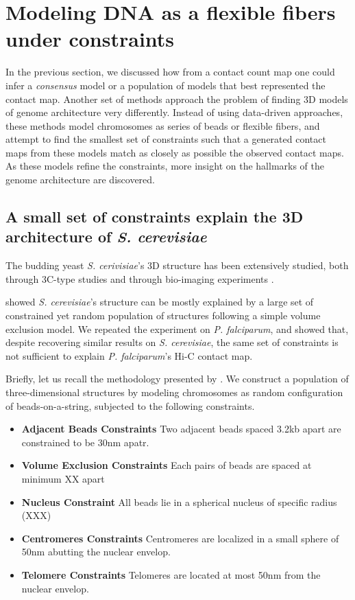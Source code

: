 \documentclass[letterpaper,12pt]{article}
\begin{document}
\section*{Modeling DNA as a flexible fibers under constraints}

In the previous section, we discussed how from a contact count map one could
infer a {\em consensus} model or a population of models that best represented
the contact map. Another set of methods approach the problem of finding 3D
models of genome architecture very differently. Instead of using data-driven
approaches, these methods model chromosomes as series of beads or flexible
fibers, and attempt to find the smallest set of constraints such that a
generated contact maps from these models match as closely as possible the
observed contact maps. As these models refine the constraints, more insight on
the hallmarks of the genome architecture are discovered.


\subsection*{A small set of constraints explain the 3D architecture of \textit{S. cerevisiae}}

The budding yeast \textit{S. cerivisiae}'s 3D structure has been extensively
studied, both through 3C-type studies \citep{dekker:capturing,
duan:three-dimensional, burton:} and through bio-imaging experiments
\citep{XX:}.


\citet{tjong:physical} showed \textit{S. cerevisiae}'s structure can be mostly
explained by a large set of constrained yet random population of structures
following a simple volume exclusion model. We repeated the experiment on {\em
P. falciparum}, and showed that, despite recovering similar results on {\em S.
cerevisiae}, the same set of constraints is not sufficient to explain {\em P.
falciparum}'s Hi-C contact map. 

Briefly, let us recall the methodology presented by \citet{tjong:physical}. We
construct a population of three-dimensional structures by modeling chromosomes
as random configuration of beads-on-a-string, subjected to the following constraints.

\begin{itemize}
\item \textbf{Adjacent Beads Constraints} Two adjacent beads spaced 3.2kb apart are constrained to be 30nm apatr.
\item \textbf{Volume Exclusion Constraints} Each pairs of beads are spaced at minimum XX apart
\item \textbf{Nucleus Constraint} All beads lie in a spherical nucleus of specific
radius (XXX)
\item \textbf{Centromeres Constraints} Centromeres are localized in a small sphere of
50nm abutting the nuclear envelop.
\item \textbf{Telomere Constraints} Telomeres are located at most 50nm from the nuclear envelop.
\end{itemize}
\end{document}
